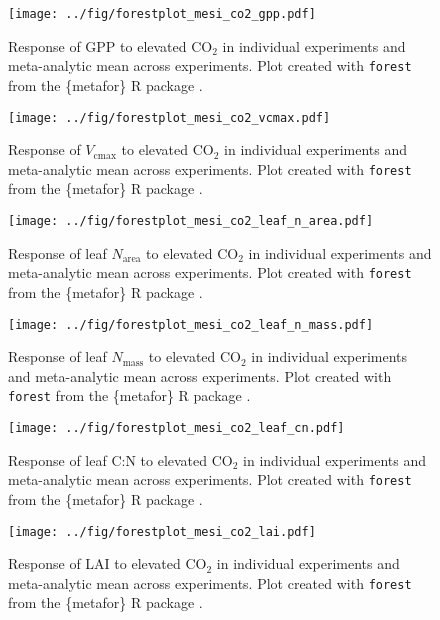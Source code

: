 \documentclass{myreport}
\begin{document}
% 

\begin{figure}[h]
\centering
\texttt{[image: ../fig/forestplot\_mesi\_co2\_gpp.pdf]}
\caption{Response of GPP to elevated CO$_2$ in individual experiments and meta-analytic mean across experiments. Plot created with \texttt{forest} from the \{metafor\} R package \cite{viechtbauer_conducting_2010}.}
\end{figure}

\begin{figure}[h]
\centering
\texttt{[image: ../fig/forestplot\_mesi\_co2\_vcmax.pdf]}
\caption{Response of $V_\text{cmax}$ to elevated CO$_2$ in individual experiments and meta-analytic mean across experiments. Plot created with \texttt{forest} from the \{metafor\} R package \cite{viechtbauer_conducting_2010}.}
\end{figure}

\begin{figure}[h]
\centering
\texttt{[image: ../fig/forestplot\_mesi\_co2\_leaf\_n\_area.pdf]}
\caption{Response of leaf $N_\text{area}$ to elevated CO$_2$ in individual experiments and meta-analytic mean across experiments. Plot created with \texttt{forest} from the \{metafor\} R package \cite{viechtbauer_conducting_2010}.}
\end{figure}

\begin{figure}[h]
\centering
\texttt{[image: ../fig/forestplot\_mesi\_co2\_leaf\_n\_mass.pdf]}
\caption{Response of leaf $N_\text{mass}$ to elevated CO$_2$ in individual experiments and meta-analytic mean across experiments. Plot created with \texttt{forest} from the \{metafor\} R package \cite{viechtbauer_conducting_2010}.}
\end{figure}

\begin{figure}[h]
\centering
\texttt{[image: ../fig/forestplot\_mesi\_co2\_leaf\_cn.pdf]}
\caption{Response of leaf C:N to elevated CO$_2$ in individual experiments and meta-analytic mean across experiments. Plot created with \texttt{forest} from the \{metafor\} R package \cite{viechtbauer_conducting_2010}.}
\end{figure}

\begin{figure}[h]
\centering
\texttt{[image: ../fig/forestplot\_mesi\_co2\_lai.pdf]}
\caption{Response of LAI to elevated CO$_2$ in individual experiments and meta-analytic mean across experiments. Plot created with \texttt{forest} from the \{metafor\} R package \cite{viechtbauer_conducting_2010}.}
\end{figure}
\end{document}

